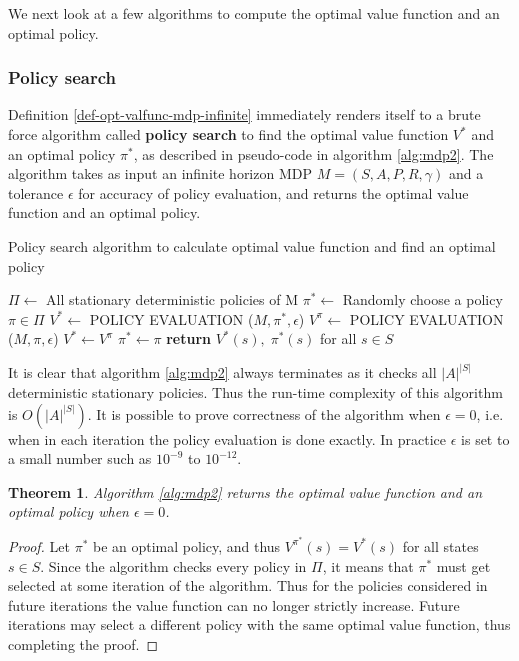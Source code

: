 \documentclass{article}
\newtheorem{theorem}{Theorem}[section]
\theoremstyle{definition}
\theoremstyle{remark}
\begin{document}
We next look at a few algorithms to compute the optimal value function and an optimal policy.

\subsubsection{Policy search}
Definition \ref{def-opt-valfunc-mdp-infinite} immediately renders itself to a brute force algorithm called \textbf{policy search} to find the optimal value function $V^{\ast}$ and an optimal policy $\pi^{\ast}$, as described in pseudo-code in algorithm \ref{alg:mdp2}. The algorithm takes as input an infinite horizon MDP $M = (S,A,P,R,\gamma)$ and a tolerance $\epsilon$ for accuracy of policy evaluation, and returns the optimal value function and an optimal policy.

\begin{algorithm}
\caption{Policy search algorithm to calculate optimal value function and find an optimal policy}\label{alg:mdp2}
\begin{algorithmic}[1]
\State $\Pi \gets $ All stationary deterministic policies of M
\State $\pi^{\ast} \gets $ Randomly choose a policy $\pi \in \Pi$
\State $V^{\ast} \gets$ \small POLICY EVALUATION \normalsize ($M,\pi^{\ast},\epsilon$)
\For{$\pi \in \Pi$}
\State $V^{\pi} \gets$ \small POLICY EVALUATION \normalsize ($M,\pi,\epsilon$)
\State $V^{\ast} \gets V^{\pi}$
\State $\pi^{\ast} \gets \pi$
\EndIf
\EndFor\label{mdp2label}
\State \textbf{return} $V^{\ast}(s), \; \pi^{\ast}(s)$ for all $s \in S$
\EndProcedure
\end{algorithmic}
\end{algorithm}

It is clear that algorithm \ref{alg:mdp2} always terminates as it checks all $|A|^{|S|}$ deterministic stationary policies. Thus the run-time complexity of this algorithm is $O(|A|^{|S|})$. It is possible to prove correctness of the algorithm when $\epsilon = 0$, i.e. when in each iteration the policy evaluation is done exactly. In practice $\epsilon$ is set to a small number such as $10^{-9}$ to $10^{-12}$.

\begin{theorem}
Algorithm \ref{alg:mdp2} returns the optimal value function and an optimal policy when $\epsilon = 0$.
\label{th-policy-iter-correctness}
\end{theorem}

\begin{proof}
Let $\pi^{\ast}$ be an optimal policy, and thus $V^{\pi^{\ast}}(s) = V^{\ast}(s)$ for all states $s \in S$. Since the algorithm checks every policy in $\Pi$, it means that $\pi^{\ast}$ must get selected at some iteration of the algorithm. Thus for the policies considered in future iterations the value function can no longer strictly increase.  Future iterations may select a different policy with the same optimal value function, thus completing the proof.
\end{proof}
\end{document}
